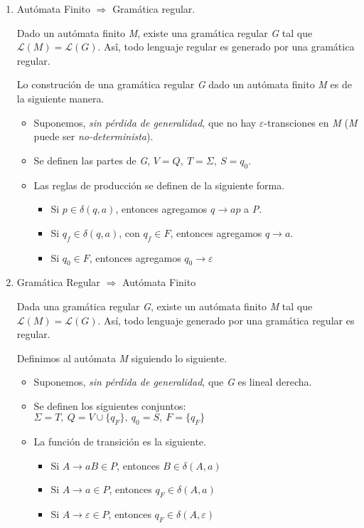 \begin{enumerate}
  \item Autómata Finito $\Longrightarrow$ Gramática regular.

    Dado un autómata finito \textit{M}, existe una gramática regular \textit{G} tal que $\mathcal L(M) = \mathcal L(G)$. Asî, todo lenguaje regular es generado por una gramática regular.

    \vskip 0.2in
    Lo construción de una gramática regular \textit{G} dado un autómata finito \textit{M} es de la siguiente manera.

    \begin{itemize}
      \item Suponemos, \textit{sin pérdida de generalidad}, que no hay $\varepsilon$-transciones en \textit{M} (\textit{M} puede ser \textit{no-determinista}).
      \item Se definen las partes de \textit{G}, $V = Q,~ T = \Sigma, ~ S = q_0$.
      \item Las reglas de producción se definen de la siguiente forma.
        \begin{itemize}
          \item Si $p \in \delta(q,a)$, entonces agregamos $q \rightarrow ap$ a \textit{P}.
          \item Si $q_f \in \delta(q,a)$, con $q_f \in F$, entonces agregamos $q \rightarrow a$.
          \item Si $q_0 \in F$, entonces agregamos $q_0 \rightarrow \varepsilon$
        \end{itemize}
    \end{itemize}

  \item Gramática Regular $\Longrightarrow$ Autómata Finito

    Dada una gramática regular \textit{G}, existe un autómata finito \textit{M} tal que $\mathcal L(M) = \mathcal L(G)$. Así, todo lenguaje generado por una gramática regular es regular.

    \vskip 0.2in
    Definimos al autómata \textit{M} siguiendo lo siguiente.

    \begin{itemize}
      \item Suponemos, \textit{sin pérdida de generalidad}, que \textit{G} es lineal derecha.
      \item Se definen los siguientes conjuntos: $\Sigma = T,~ Q = V \cup \{q_F\}, ~ q_0 = S,~ F = \{q_F\}$
      \item La función de transición es la siguiente.
        \begin{itemize}
          \item Si $A \rightarrow aB \in P$, entonces $B \in \delta(A,a)$
          \item Si $A \rightarrow a \in P$, entonces $q_F \in \delta(A,a)$
          \item Si $A \rightarrow \varepsilon \in P$, entonces $q_F \in \delta(A,\varepsilon)$
        \end{itemize}
    \end{itemize}
\end{enumerate}

